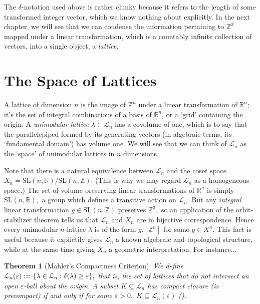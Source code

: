 \documentclass[12pt, letterpaper, oneside]{book}
\newcommand{\gd}{\ensuremath{\delta}}
\renewcommand{\ge}{\ensuremath{\varepsilon}}
\newcommand{\gl}{\ensuremath{\lambda}}
\newcommand{\R}{\mathbb{R}}
\newcommand{\Z}{\mathbb{Z}}
\DeclarePairedDelimiter{\set}{\lbrace}{\rbrace}
\theoremstyle{plain}
\newtheorem{theorem}{Theorem}
\theoremstyle{definition}
\theoremstyle{remark}
\begin{document}
The $\gd$-notation used above is rather clunky because it refers to the length of some transformed integer vector, which we know nothing about explicitly. In the next chapter, we will see that we can condense the information pertaining to $\Z^3$ mapped under a linear transformation, which is a countably infinite collection of vectors, into a single object, a \textit{lattice}.

\section{The Space of Lattices}

A lattice of dimension $n$ is the image of $\Z^n$ under a linear transformation of $\R^n$; it's the set of integral combinations of a basis of $\R^n$, or a `grid' containing the origin. 
A \textit{unimodular lattice} $\gl \in \mathcal{L}_n$ has a covolume of one, which is to say that the parallelepiped formed by its generating vectors (in algebraic terms, its `fundamental domain') has volume one. We will see that we can think of $\mathcal{L}_n$ as the `space' of unimodular lattices in $n$ dimensions.

Note that there is a natural equivalence between $\mathcal{L}_n$ and the coset space $ X_n = \mbox{SL}(n, \R) / \mbox{SL}(n, \Z).$ (This is why we may regard $\mathcal{L}_n$ as a homogeneous space.) The set of volume-preserving linear transformations of $\R^n$ is simply $\mbox{SL}(n, \R),$ a group which defines a transitive action on $\mathcal{L}_n.$ But any \textit{integral} linear transformation $g \in \mbox{SL}(n, \Z)$ preserves $\Z^3,$ so an application of the orbit-stabilizer theorem tells us that $\mathcal{L}_n$ and $X_n$ are in bijective correspondence. Hence every unimodular $n$-lattice $\gl$ is of the form $g. [\Z^n]$ for some $g \in X^n.$ This fact is useful because it explictily gives $\mathcal{L}_n$ a known algebraic and topological structure, while at the same time giving $X_n$ a geometric interpretation. For instance...

\begin{theorem}[Mahler's Compactness Criterion]
We define $\mathcal{L}_n(\ge):= \set{\gl \in \mathcal{L}_n: \gd(\gl) \geq \ge},$ that is, the set of lattices that do not intersect an open $\ge$-ball about the origin. A subset $K \subseteq \mathcal{L}_n$ has compact closure (is \textit{precompact}) if and only if for some $\ge > 0,$ $K \subseteq \mathcal{L}_n(\ge)$ (\cite{ME11}).
\end{theorem} 
\end{document}
